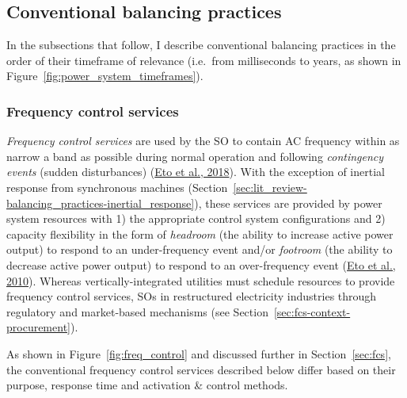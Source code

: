 \documentclass[12pt,a4paper,]{report}
\begin{document}
\hypertarget{conventional-balancing-practices}{%
\subsection{Conventional balancing
practices}\label{conventional-balancing-practices}}

In the subsections that follow, I describe conventional balancing
practices in the order of their timeframe of relevance (i.e.~from
milliseconds to years, as shown in
Figure~\ref{fig:power_system_timeframes}).

\hypertarget{frequency-control-services}{%
\subsubsection{Frequency control
services}\label{frequency-control-services}}

\emph{Frequency control services} are used by the SO to contain AC
frequency within as narrow a band as possible during normal operation
and following \emph{contingency events} (sudden disturbances)
(\protect\hyperlink{ref-etoFrequencyControlRequirements2018}{Eto et al.,
2018}). With the exception of inertial response from synchronous
machines
(Section~\ref{sec:lit_review-balancing_practices-inertial_response}),
these services are provided by power system resources with 1) the
appropriate control system configurations and 2) capacity flexibility in
the form of \emph{headroom} (the ability to increase active power
output) to respond to an under-frequency event and/or \emph{footroom}
(the ability to decrease active power output) to respond to an
over-frequency event
(\protect\hyperlink{ref-etoUseFrequencyResponse2010}{Eto et al., 2010}).
Whereas vertically-integrated utilities must schedule resources to
provide frequency control services, SOs in restructured electricity
industries through regulatory and market-based mechanisms (see
Section~\ref{sec:fcs-context-procurement}).

As shown in Figure~\ref{fig:freq_control} and discussed further in
Section~\ref{sec:fcs}, the conventional frequency control services
described below differ based on their purpose, response time and
activation \& control methods.
\end{document}
